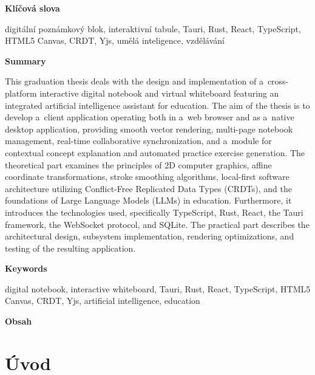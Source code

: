 \documentclass[12pt, a4paper, oneside]{article}
\newcommand{\nadpismimoobsah}[1]{%
    \vspace{6pt}%
    {\normalfont\fontsize{14pt}{18pt}\selectfont\sffamily\bfseries #1\par}%
    \vspace{2pt}%
}
\begin{document}
\nadpismimoobsah{Klíčová slova}
digitální poznámkový blok, interaktivní tabule, Tauri, Rust, React, TypeScript, HTML5 Canvas, CRDT, Yjs, umělá inteligence, vzdělávání

\clearpage

\nadpismimoobsah{Summary}
This graduation thesis deals with the design and implementation of a~cross-platform interactive digital notebook and virtual whiteboard featuring an integrated artificial intelligence assistant for education. The aim of the thesis is to develop a~client application operating both in a~web browser and as a~native desktop application, providing smooth vector rendering, multi-page notebook management, real-time collaborative synchronization, and a~module for contextual concept explanation and automated practice exercise generation. The theoretical part examines the principles of 2D computer graphics, affine coordinate transformations, stroke smoothing algorithms, local-first software architecture utilizing Conflict-Free Replicated Data Types (CRDTs), and the foundations of Large Language Models (LLMs) in education. Furthermore, it introduces the technologies used, specifically TypeScript, Rust, React, the Tauri framework, the WebSocket protocol, and SQLite. The practical part describes the architectural design, subsystem implementation, rendering optimizations, and testing of the resulting application.

\nadpismimoobsah{Keywords}
digital notebook, interactive whiteboard, Tauri, Rust, React, TypeScript, HTML5 Canvas, CRDT, Yjs, artificial intelligence, education

\clearpage

\nadpismimoobsah{Obsah}
\makeatletter
{}
\makeatother

\clearpage


\section{Úvod}
\label{sec:uvod}
\end{document}
